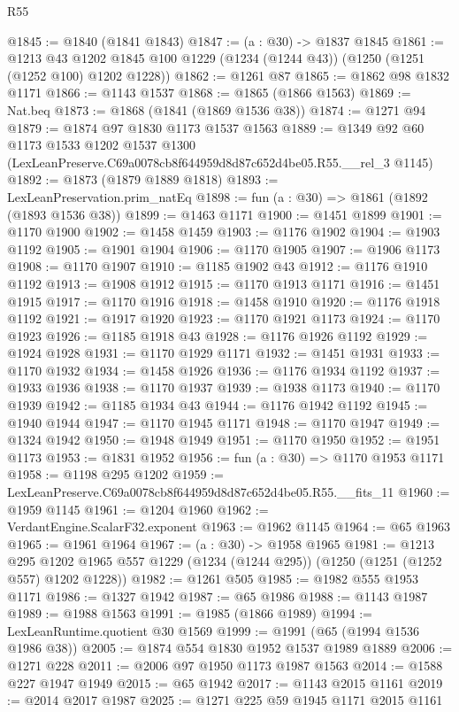 \begin{lexlean}{R55}
\begin{coremodule}
@1845 := @1840 (@1841 @1843)
@1847 := (a : @30) -> @1837 @1845
@1861 := @1213
    @43
    @1202
    @1845
    @100
    @1229
    (@1234 (@1244 @43))
    (@1250 (@1251 (@1252 @100) @1202 @1228))
@1862 := @1261 @87
@1865 := @1862 @98 @1832 @1171
@1866 := @1143 @1537
@1868 := @1865 (@1866 @1563)
@1869 := Nat.beq
@1873 := @1868 (@1841 (@1869 @1536 @38))
@1874 := @1271 @94
@1879 := @1874 @97 @1830 @1173 @1537 @1563
@1889 := @1349
    @92
    @60
    @1173
    @1533
    @1202
    @1537
    @1300
    (LexLeanPreserve.C69a0078cb8f644959d8d87c652d4be05.R55.__rel_3 @1145)
@1892 := @1873 (@1879 @1889 @1818)
@1893 := LexLeanPreservation.prim_natEq
@1898 := fun (a : @30) => @1861 (@1892 (@1893 @1536 @38))
@1899 := @1463 @1171
@1900 := @1451 @1899
@1901 := @1170 @1900
@1902 := @1458 @1459
@1903 := @1176 @1902
@1904 := @1903 @1192
@1905 := @1901 @1904
@1906 := @1170 @1905
@1907 := @1906 @1173
@1908 := @1170 @1907
@1910 := @1185 @1902 @43
@1912 := @1176 @1910 @1192
@1913 := @1908 @1912
@1915 := @1170 @1913 @1171
@1916 := @1451 @1915
@1917 := @1170 @1916
@1918 := @1458 @1910
@1920 := @1176 @1918 @1192
@1921 := @1917 @1920
@1923 := @1170 @1921 @1173
@1924 := @1170 @1923
@1926 := @1185 @1918 @43
@1928 := @1176 @1926 @1192
@1929 := @1924 @1928
@1931 := @1170 @1929 @1171
@1932 := @1451 @1931
@1933 := @1170 @1932
@1934 := @1458 @1926
@1936 := @1176 @1934 @1192
@1937 := @1933 @1936
@1938 := @1170 @1937
@1939 := @1938 @1173
@1940 := @1170 @1939
@1942 := @1185 @1934 @43
@1944 := @1176 @1942 @1192
@1945 := @1940 @1944
@1947 := @1170 @1945 @1171
@1948 := @1170 @1947
@1949 := @1324 @1942
@1950 := @1948 @1949
@1951 := @1170 @1950
@1952 := @1951 @1173
@1953 := @1831 @1952
@1956 := fun (a : @30) => @1170 @1953 @1171
@1958 := @1198 @295 @1202
@1959 := LexLeanPreserve.C69a0078cb8f644959d8d87c652d4be05.R55.__fits_11
@1960 := @1959 @1145
@1961 := @1204 @1960
@1962 := VerdantEngine.ScalarF32.exponent
@1963 := @1962 @1145
@1964 := @65 @1963
@1965 := @1961 @1964
@1967 := (a : @30) -> @1958 @1965
@1981 := @1213
    @295
    @1202
    @1965
    @557
    @1229
    (@1234 (@1244 @295))
    (@1250 (@1251 (@1252 @557) @1202 @1228))
@1982 := @1261 @505
@1985 := @1982 @555 @1953 @1171
@1986 := @1327 @1942
@1987 := @65 @1986
@1988 := @1143 @1987
@1989 := @1988 @1563
@1991 := @1985 (@1866 @1989)
@1994 := LexLeanRuntime.quotient @30 @1569
@1999 := @1991 (@65 (@1994 @1536 @1986 @38))
@2005 := @1874 @554 @1830 @1952 @1537 @1989 @1889
@2006 := @1271 @228
@2011 := @2006 @97 @1950 @1173 @1987 @1563
@2014 := @1588 @227 @1947 @1949
@2015 := @65 @1942
@2017 := @1143 @2015 @1161
@2019 := @2014 @2017 @1987
@2025 := @1271 @225 @59 @1945 @1171 @2015 @1161

\end{coremodule}
\end{lexlean}
